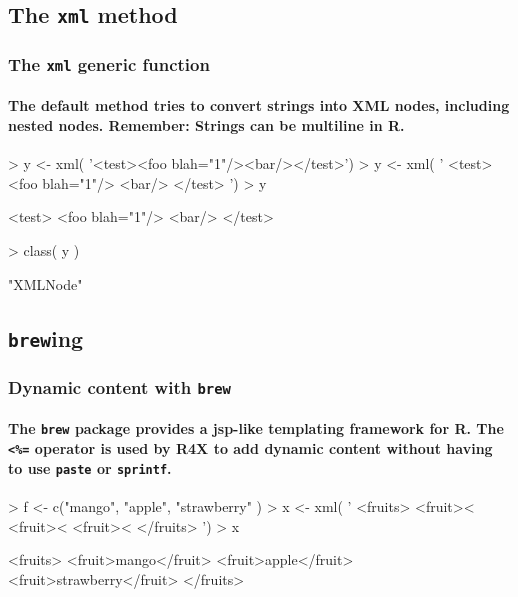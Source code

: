 \documentclass[smaller]{beamer}
\newcommand{\rfun}[1]{\texttt{#1}}
\begin{document}
\subsection{The \rfun{xml} method}
\begin{frame}[fragile]
\frametitle{The \rfun{xml} generic function}
\framesubtitle{The default method tries to convert strings into XML nodes, including nested nodes. Remember: Strings can be multiline in R.}
\begin{Schunk}
\begin{Sinput}
> y <- xml( '<test><foo blah="1"/><bar/></test>')
> y <- xml( '
    <test>
       <foo blah="1"/>
       <bar/>
    </test>
  ')
> y
\end{Sinput}
\begin{Soutput}
<test>
 <foo blah="1"/>
 <bar/>
</test>
\end{Soutput}
\begin{Sinput}
> class( y )
\end{Sinput}
\begin{Soutput}
[1] "XMLNode"
\end{Soutput}
\end{Schunk}
\end{frame}

\subsection{\texttt{brew}ing}
\begin{frame}[fragile]
\frametitle{Dynamic content with \rfun{brew}}
\framesubtitle{The \rfun{brew} package provides a jsp-like templating framework for R. The \texttt{<\%=} operator is used by R4X to add dynamic content without
having to use \rfun{paste} or \rfun{sprintf}. } 
\begin{Schunk}
\begin{Sinput}
> f <- c("mango", "apple", "strawberry" )
> x <- xml( '
    <fruits>
      <fruit><%
      <fruit><%
      <fruit><%
    </fruits>
  ')
> x 
\end{Sinput}
\begin{Soutput}
<fruits>
 <fruit>mango</fruit>
 <fruit>apple</fruit>
 <fruit>strawberry</fruit>
</fruits>
\end{Soutput}
\end{Schunk}
\end{frame}
\end{document}
